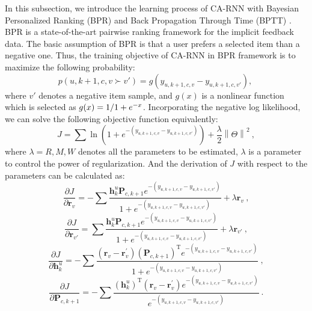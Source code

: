\documentclass[conference]{IEEEtran}
\begin{document}
In this subsection, we introduce the learning process of CA-RNN with Bayesian Personalized Ranking (BPR) \cite{rendle2009bpr} and Back Propagation Through Time (BPTT) \cite{rumelhart1988learning}.
BPR is a state-of-the-art pairwise ranking framework for the implicit feedback data. The basic assumption of BPR is that a user prefers a selected item than a negative one. Thus, the training objective of CA-RNN in BPR framework is to maximize the following probability:
\begin{equation}
p(u, k+1, c, v\succ v') = g(y_{u, k+1, c, v} - y_{u, k+1, c, v'}),~
\end{equation}
where $v'$ denotes a negative item sample, and $g(x)$ is a nonlinear function which is selected as $g(x) = {1 \mathord{\left/ \right. \kern-\nulldelimiterspace} 1 + e^{ - x}}$. Incorporating the negative log likelihood, we can solve the following objective function equivalently:
\begin{equation}
J = \sum \ln(1+e^{-(y_{u,k+1,c,v} - y_{u,k+1,c,v'})})+\frac{\lambda }{2}\left \| \Theta  \right \|^{2}  ~,
\end{equation}
where $\lambda = {R, M ,W}$ denotes all the parameters to be estimated, $\lambda$ is a parameter to control the power of regularization. And the derivation of $J$ with respect to the parameters can be calculated as: 
\begin{displaymath}
\frac{\partial J}{\partial \mathbf{r}_{v}} = -\sum \frac{\mathbf{h}_{k}^{u}\mathbf{P}_{c,k+1}e^{-(y_{u, k+1, c, v} - y_{u, k+1, c, v'})}}{1+e^{-(y_{u, k+1, c, v} - y_{u, k+1, c, v'})}}+\lambda \mathbf{r}_{v}  ~,
\end{displaymath}
\begin{displaymath}
\frac{\partial J}{\partial \mathbf{r}_{v'}} = \sum \frac{\mathbf{h}_{k}^{u}\mathbf{P}_{c,k+1}e^{-(y_{u, k+1, c, v} - y_{u, k+1, c, v'})}}{1+e^{-(y_{u, k+1, c, v} - y_{u, k+1, c, v'})}}+\lambda \mathbf{r}_{v'}  ~,
\end{displaymath}
\begin{displaymath}
\frac{\partial J}{\partial \mathbf{h}_{k}^{u}} = -\sum \frac{(\mathbf{r}_{v}-\mathbf{r}_{v}^{'})(\mathbf{P}_{c,k+1})^{\mathrm{ T }}e^{-(y_{u, k+1, c, v} - y_{u, k+1, c, v'})}}{1+e^{-(y_{u, k+1, c, v} - y_{u, k+1, c, v'})}}   ~,
\end{displaymath}
\begin{displaymath}
\frac{\partial J}{\partial \mathbf{P}_{c,k+1}} = -\sum \frac{(\mathbf{h}_{k}^{u})^{\mathrm T}(\mathbf{r}_{v}-\mathbf{r}_{v}^{'})e^{-(y_{u, k+1, c, v} - y_{u, k+1, c, v'})}
}{e^{-(y_{u, k+1, c, v} - y_{u, k+1, c, v'})}}    ~.
\end{displaymath}
\end{document}
